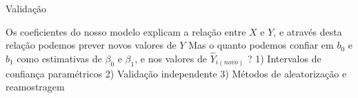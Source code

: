 \documentclass{beamer}\usepackage[]{graphicx}\usepackage[]{color}
\begin{document}
\begin{frame}{Validação}

Os coeficientes do nosso modelo explicam a relação entre $X$ e $Y$, e através desta relação podemos prever novos valores de $Y$ \pause
\vfill
Mas o quanto podemos confiar em $b_0$ e $b_1$ como estimativas de $\beta _0$ e $\beta _1$, e nos valores de $\hat Y_{i(novo)}$ ? \pause
\vfill
1) Intervalos de confiança paramétricos \pause
\vfill
2) Validação independente \pause
\vfill
3) Métodos de aleatorização e reamostragem

\end{frame}


\end{document}
